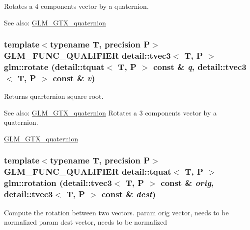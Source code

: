 Rotates a 4 components vector by a quaternion.

\begin{Desc}
\item[See also:]\hyperlink{group__gtx__quaternion}{GLM\_\-GTX\_\-quaternion} \end{Desc}
\hypertarget{group__gtx__quaternion_g3b9f985e75b852e9526d5c088a50c3d4}{
\subsubsection[rotate]{\setlength{\rightskip}{0pt plus 5cm}template$<$typename T, precision P$>$ GLM\_\-FUNC\_\-QUALIFIER detail::tvec3$<$ T, P $>$ glm::rotate (detail::tquat$<$ T, P $>$ const \& {\em q}, \/  detail::tvec3$<$ T, P $>$ const \& {\em v})}}
\label{group__gtx__quaternion_g3b9f985e75b852e9526d5c088a50c3d4}


Returns quarternion square root.

\begin{Desc}
\item[See also:]\hyperlink{group__gtx__quaternion}{GLM\_\-GTX\_\-quaternion} Rotates a 3 components vector by a quaternion.

\hyperlink{group__gtx__quaternion}{GLM\_\-GTX\_\-quaternion} \end{Desc}
\hypertarget{group__gtx__quaternion_gf7a15242ef69e5c997df231b28b92cef}{
\subsubsection[rotation]{\setlength{\rightskip}{0pt plus 5cm}template$<$typename T, precision P$>$ GLM\_\-FUNC\_\-QUALIFIER detail::tquat$<$ T, P $>$ glm::rotation (detail::tvec3$<$ T, P $>$ const \& {\em orig}, \/  detail::tvec3$<$ T, P $>$ const \& {\em dest})}}
\label{group__gtx__quaternion_gf7a15242ef69e5c997df231b28b92cef}


Compute the rotation between two vectors. param orig vector, needs to be normalized param dest vector, needs to be normalized

